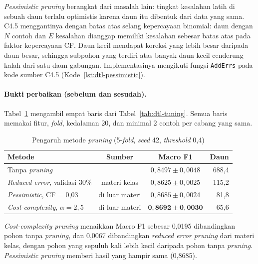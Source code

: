 \textit{Pessimistic pruning} \cite{quinlan1993c45} berangkat dari masalah lain: tingkat kesalahan
latih di sebuah daun terlalu optimistis karena daun itu dibentuk dari data yang sama. C4.5 menggantinya
dengan batas atas selang kepercayaan binomial: daun dengan $N$ contoh dan $E$ kesalahan dianggap
memiliki kesalahan sebesar batas atas pada faktor kepercayaan CF. Daun kecil mendapat koreksi yang
lebih besar daripada daun besar, sehingga subpohon yang terdiri atas banyak daun kecil cenderung kalah
dari satu daun gabungan. Implementasinya mengikuti fungsi \texttt{AddErrs} pada kode sumber C4.5
(Kode~\ref{lst:dtl-pessimistic}).

\paragraph{Bukti perbaikan (sebelum dan sesudah).} Tabel~\ref{tab:dtl-bonus-pruning} mengambil empat
baris dari Tabel~\ref{tab:dtl-tuning}. Semua baris memakai fitur, \textit{fold}, kedalaman 20, dan
minimal 2 contoh per cabang yang sama.

\begin{table}[H]
	\centering
	\caption{Pengaruh metode \textit{pruning} (5-\textit{fold}, \textit{seed} 42, \textit{threshold} 0,4)}
	\label{tab:dtl-bonus-pruning}
	\begin{tabular}{l c c r}
		\toprule
		\textbf{Metode} & \textbf{Sumber} & \textbf{Macro F1} & \textbf{Daun} \\
		\midrule
		Tanpa \textit{pruning} & & $0{,}8497 \pm 0{,}0048$ & 688,4 \\
		\textit{Reduced error}, validasi 30\% & materi kelas & $0{,}8625 \pm 0{,}0025$ & 115,2 \\
		\textit{Pessimistic}, CF = 0,03 & di luar materi & $0{,}8685 \pm 0{,}0024$ & 81,8 \\
		\textit{Cost-complexity}, $\alpha = 2{,}5$ & di luar materi & $\mathbf{0{,}8692 \pm 0{,}0030}$ & 65,6 \\
		\bottomrule
	\end{tabular}
\end{table}

\textit{Cost-complexity pruning} menaikkan Macro F1 sebesar 0,0195 dibandingkan pohon tanpa
\textit{pruning}, dan 0,0067 dibandingkan \textit{reduced error pruning} dari materi kelas, dengan
pohon yang sepuluh kali lebih kecil daripada pohon tanpa \textit{pruning}. \textit{Pessimistic
pruning} memberi hasil yang hampir sama (0,8685).

